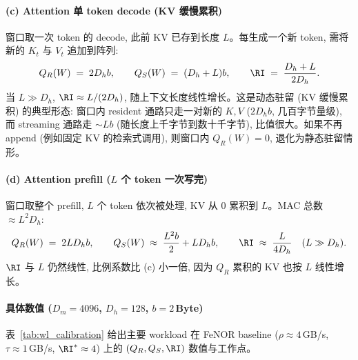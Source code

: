 \paragraph{(c) Attention 单 token decode (KV 缓慢累积)}
窗口取一次 token 的 decode, 此前 KV 已存到长度 $L$。每生成一个新 token, 需将新的 $K_t$ 与 $V_t$ 追加到阵列:
\[
Q_R(W) \;=\; 2 D_h b, \qquad Q_S(W) \;=\; (D_h + L) b, \qquad \RI \;=\; \frac{D_h + L}{2 D_h}.
\]
当 $L \gg D_h$, $\RI \approx L / (2 D_h)$, 随上下文长度线性增长。这是动态驻留 (KV 缓慢累积) 的典型形态: 窗口内 resident 通路只走一对新的 $K, V$ ($2 D_h b$, 几百字节量级), 而 streaming 通路走 $\sim L b$ (随长度上千字节到数十千字节), 比值很大。如果不再 append (例如固定 KV 的检索式调用), 则窗口内 $Q_R(W) = 0$, 退化为静态驻留情形。

\paragraph{(d) Attention prefill ($L$ 个 token 一次写完)}
窗口取整个 prefill, $L$ 个 token 依次被处理, KV 从 0 累积到 $L$。MAC 总数 $\approx L^2 D_h$:
\[
Q_R(W) \;=\; 2 L D_h b, \qquad Q_S(W) \;\approx\; \frac{L^2 b}{2} + L D_h b, \qquad \RI \;\approx\; \frac{L}{4 D_h} \quad (L \gg D_h).
\]
$\RI$ 与 $L$ 仍然线性, 比例系数比 (c) 小一倍, 因为 $Q_R$ 累积的 KV 也按 $L$ 线性增长。

\paragraph{具体数值 ($D_m = 4096$, $D_h = 128$, $b = 2$\,Byte)}
表~\ref{tab:wl_calibration} 给出主要 workload 在 FeNOR baseline ($\rho \approx 4$\,GB/s, $\tau \approx 1$\,GB/s, $\RI^{*} \approx 4$) 上的 $(Q_R, Q_S, \RI)$ 数值与工作点。

